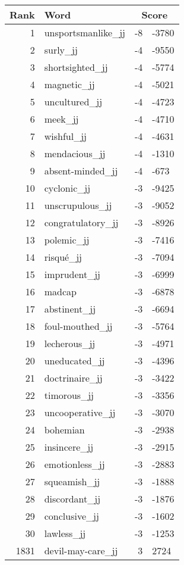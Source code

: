 \begin{longtable}[!htbp]{| rlr@{.}l |}
    \hline
    \textbf{Rank} & \textbf{Word} & \multicolumn{2}{c|}{\textbf{Score}} \\
    \hline
    \endhead
    1 & unsportsmanlike\_jj & -8 & -3780 \\
    2 & surly\_jj & -4 & -9550 \\
    3 & shortsighted\_jj & -4 & -5774 \\
    4 & magnetic\_jj & -4 & -5021 \\
    5 & uncultured\_jj & -4 & -4723 \\
    6 & meek\_jj & -4 & -4710 \\
    7 & wishful\_jj & -4 & -4631 \\
    8 & mendacious\_jj & -4 & -1310 \\
    9 & absent-minded\_jj & -4 & -673 \\
    10 & cyclonic\_jj & -3 & -9425 \\
    11 & unscrupulous\_jj & -3 & -9052 \\
    12 & congratulatory\_jj & -3 & -8926 \\
    13 & polemic\_jj & -3 & -7416 \\
    14 & risqué\_jj & -3 & -7094 \\
    15 & imprudent\_jj & -3 & -6999 \\
    16 & madcap & -3 & -6878 \\
    17 & abstinent\_jj & -3 & -6694 \\
    18 & foul-mouthed\_jj & -3 & -5764 \\
    19 & lecherous\_jj & -3 & -4971 \\
    20 & uneducated\_jj & -3 & -4396 \\
    21 & doctrinaire\_jj & -3 & -3422 \\
    22 & timorous\_jj & -3 & -3356 \\
    23 & uncooperative\_jj & -3 & -3070 \\
    24 & bohemian & -3 & -2938 \\
    25 & insincere\_jj & -3 & -2915 \\
    26 & emotionless\_jj & -3 & -2883 \\
    27 & squeamish\_jj & -3 & -1888 \\
    28 & discordant\_jj & -3 & -1876 \\
    29 & conclusive\_jj & -3 & -1602 \\
    30 & lawless\_jj & -3 & -1253 \\
    1831 & devil-may-care\_jj & 3 & 2724 \\

\end{longtable}
